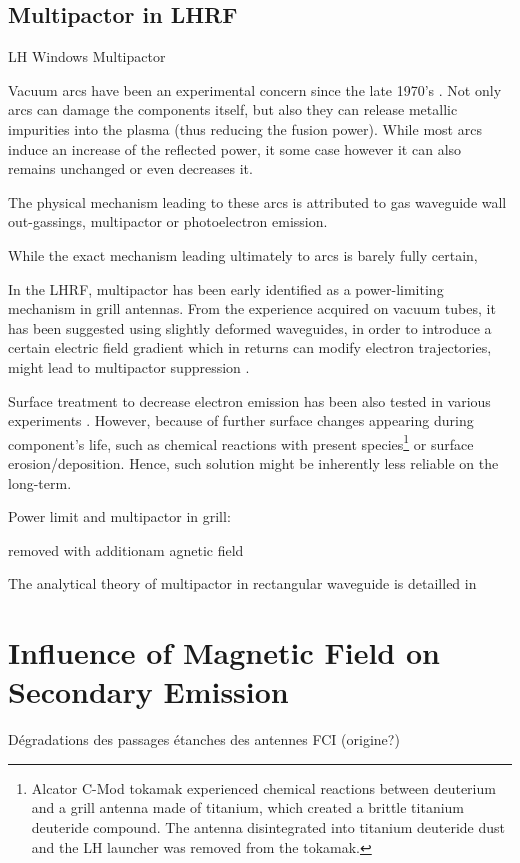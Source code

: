 \subsection{Multipactor in LHRF}\label{sec:multipactor_lhrf}

LH Windows Multipactor

Vacuum arcs have been an experimental concern since the late 1970's . Not only arcs can damage the components itself, but also they can release metallic impurities into the plasma (thus reducing the fusion power). While most arcs induce an increase of the reflected power, it some case however it can also remains unchanged or even decreases it.

The physical mechanism leading to these arcs is attributed to gas waveguide wall out-gassings, multipactor or photoelectron emission.

While the exact mechanism leading ultimately to arcs is barely fully certain, 

In the LHRF, multipactor has been early identified as a power-limiting mechanism in grill antennas. From the experience acquired on vacuum tubes, it has been suggested using slightly deformed waveguides, in order to introduce a certain electric field gradient which in returns can modify electron trajectories, might lead to multipactor suppression . 

Surface treatment to decrease electron emission has been also tested in various experiments . However, because of further surface changes appearing during component's life, such as chemical reactions with present species\footnote{Alcator C-Mod tokamak experienced chemical reactions between deuterium and a grill antenna made of titanium, which created a brittle titanium deuteride compound. The antenna disintegrated into titanium deuteride dust and the LH launcher was removed from the tokamak\cite{wallace2010}.} or surface erosion/deposition. Hence, such solution might be inherently less reliable on the long-term. 

Power limit and multipactor in grill:\cite{hwang1981, vaughan1982, goniche2012-2, goniche2014} 

removed with additionam agnetic field 
	
	
		


The analytical theory of multipactor in rectangular waveguide is detailled in  


\section{Influence of Magnetic Field on Secondary Emission}





Dégradations des passages étanches des antennes FCI (origine?)







